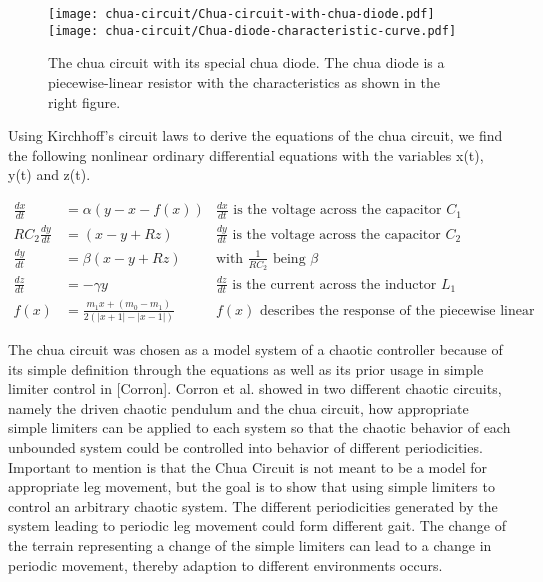 \documentclass[main]{subfiles}
\begin{document}
\begin{figure}[H]
\centering
\texttt{[image: chua-circuit/Chua-circuit-with-chua-diode.pdf]}
\texttt{[image: chua-circuit/Chua-diode-characteristic-curve.pdf]}
\caption[The chua circuit]{The chua circuit with its special chua diode. The chua diode is a piecewise-linear resistor with the characteristics as shown in the right figure.}
\label{figure:chuacircuit}
\end{figure}

Using Kirchhoff's circuit laws to derive the equations of the chua circuit, we find the following nonlinear ordinary differential equations with the variables x(t), y(t) and z(t).

\begin{align*}
\frac{dx}{dt}&=\alpha (y-x-f(x)) &\frac{dx}{dt}\text{ is the voltage across the capacitor }C_1\\
RC_2\frac{dy}{dt}&= (x-y+Rz) &\frac{dy}{dt}\text{ is the voltage across the capacitor }C_2\\
\frac{dy}{dt}&=\beta (x-y+Rz) &\text{with } \frac{1}{RC_2} \text{ being }\beta\\
\frac{dz}{dt}&=-\gamma y &\frac{dz}{dt}\text{ is the current across the inductor }L_1\\
f (x) &= \frac{m_1 x + (m_0 - m_1)}{2 (| x + 1 | -| x - 1 |)} &f(x)\text{ describes the response of the piecewise linear resistor}
\end{align*}

\begin{comment}
dx/dt = c1*(y - x - f (x)) // m0 : slope in outer region
    dy/dt = c2*(x - y + z)    // m1 : slope in inner region
    dz/dt = -c3*y         // b : Breakpoints
    f (x) = m1*x + (m0 - m1)/2*(| x + 1 | -| x - 1 |)
\end{comment}

The chua circuit was chosen as a model system of a chaotic controller because of its simple definition through the equations as well as its prior usage in simple limiter control in [Corron]. Corron et al. showed in two different chaotic circuits, namely the driven chaotic pendulum and the chua circuit, how appropriate simple limiters can be applied to each system so that the chaotic behavior of each unbounded system could be controlled into behavior of different periodicities. Important to mention is that the Chua Circuit is not meant to be a model for appropriate leg movement, but the goal is to show that using simple limiters to control an arbitrary chaotic system. The different periodicities generated by the system leading to periodic leg movement could form different gait. The change of the terrain representing a change of the simple limiters can lead to a change in periodic movement, thereby adaption to different environments occurs. 
\end{document}
